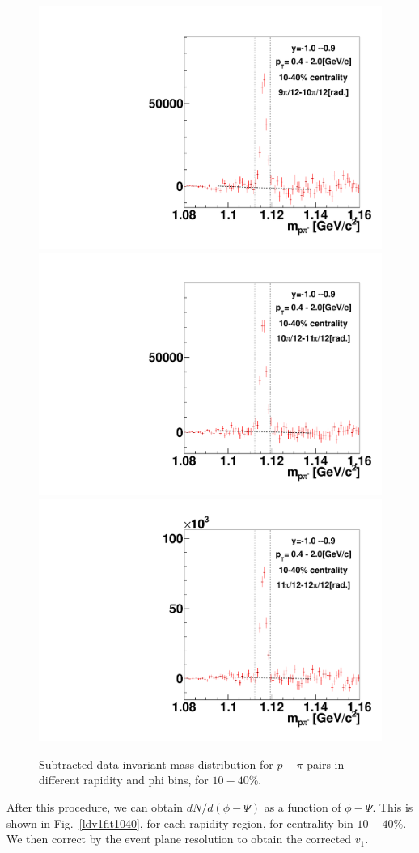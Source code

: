 \begin{figure}[h]
\includegraphics[width=0.14\linewidth]{chapterX/fig/ld_v1_sig/kf_ptslice0_cent1_ld_flow_phi10_rap14.pdf}
\includegraphics[width=0.14\linewidth]{chapterX/fig/ld_v1_sig/kf_ptslice0_cent1_ld_flow_phi11_rap14.pdf}
\includegraphics[width=0.14\linewidth]{chapterX/fig/ld_v1_sig/kf_ptslice0_cent1_ld_flow_phi12_rap14.pdf}

\caption{Subtracted data invariant mass distribution for $p-\pi$ pairs in different rapidity and phi bins, for $10-40\%$.}
\label{ld_v1_sig2}
\end{figure}

After this procedure, we can obtain $dN/d(\phi-\Psi)$ as a function of $\phi-\Psi$. This is shown in Fig.~\ref{ldv1fit1040}, for each rapidity region, for centrality bin $10-40\%$. We then correct by the event plane resolution to obtain the corrected $v_{1}$. 

